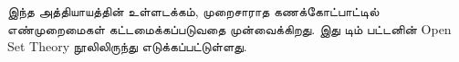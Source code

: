 \documentclass[../../../include/open-logic-section]{subfiles}
\begin{document}
	

\begin{editorial}
இந்த அத்தியாயத்தின் உள்ளடக்கம், முறைசாராத கணக்கோட்பாட்டில்
எண்முறைமைகள் கட்டமைக்கப்படுவதை முன்வைக்கிறது.
இது டிம் பட்டனின் Open Set Theory நூலிலிருந்து எடுக்கப்பட்டுள்ளது.
\end{editorial}


\OLEndChapterHook
\end{document}
